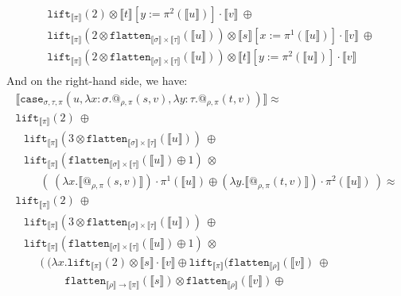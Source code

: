 \documentclass[a4paper,UKenglish,cleveref,autoref,numberwithinsect]{lipics-v2019}
\theoremstyle{definition}
\newcommand{\arrtype}{\rightarrow}
\newcommand{\abs}[2]{\lambda #1.#2}
\newcommand{\flatten}{\mathtt{flatten}}
\newcommand{\lift}{\mathtt{lift}}
\newcommand{\typeinterpret}[1]{\llbracket #1 \rrbracket}
\newcommand{\interpret}[1]{\llbracket #1 \rrbracket}
\begin{document}
\begin{itemize}
\[\begin{array}{l}
  \phantom{A}
  \lift_{\typeinterpret{\pi}}(2) \otimes
     \interpret{t}[y:=\pi^2(\interpret{u})] \cdot \interpret{v}\ 
     \oplus \\
  \phantom{A}
  \lift_{\typeinterpret{\pi}}(2 \otimes
    \flatten_{\typeinterpret{\sigma} \times \typeinterpret{\tau}}(
    \interpret{u})) \otimes
    \interpret{s}[x:=\pi^1(\interpret{u})] \cdot \interpret{v}\ \oplus \\
  \phantom{A}
  \lift_{\typeinterpret{\pi}}(2 \otimes
    \flatten_{\typeinterpret{\sigma} \times \typeinterpret{\tau}}(
    \interpret{u})) \otimes
     \interpret{t}[y:=\pi^2(\interpret{u})] \cdot \interpret{v} \\
  \end{array}
  \]
  And on the right-hand side, we have:
  \[
  \begin{array}{l}
  \interpret{\mathtt{case}_{\sigma,\tau,\pi}(u,\abs{x:\sigma}{
  @_{\rho,\pi}(s,v)},\abs{y:\tau}{@_{\rho,\pi}(t,v)})} \approx \\
  \lift_{\typeinterpret{\pi}}(2)\ \oplus \\
  \phantom{A}
  \lift_{\typeinterpret{\pi}}(3 \otimes \flatten_{\typeinterpret{\sigma}
    \times \typeinterpret{\tau}}(\interpret{u}))\ \oplus \\
  \phantom{A}
  \lift_{\typeinterpret{\pi}}(\flatten_{\typeinterpret{\sigma} \times
    \typeinterpret{\tau}}(\interpret{u}) \oplus 1)\ \otimes \\
  \phantom{ABC}
  (\ (\abs{x}{\interpret{@_{\rho,\pi}(s,v)}}) \cdot \pi^1(
      \interpret{u}) \oplus
     (\abs{y}{\interpret{@_{\rho,\pi}(t,v)}}) \cdot \pi^2(
      \interpret{u})\ ) \approx \\
  \lift_{\typeinterpret{\pi}}(2)\ \oplus \\
  \phantom{A}
  \lift_{\typeinterpret{\pi}}(3 \otimes \flatten_{\typeinterpret{\sigma}
    \times \typeinterpret{\tau}}(\interpret{u}))\ \oplus \\
  \phantom{A}
  \lift_{\typeinterpret{\pi}}(\flatten_{\typeinterpret{\sigma} \times
    \typeinterpret{\tau}}(\interpret{u}) \oplus 1)\ \otimes \\
  \phantom{ABC}
  (\ (\abs{x}{\lift_{\typeinterpret{\pi}}(2) \otimes
    \interpret{s} \cdot \interpret{v} \oplus
    \lift_{\typeinterpret{\pi}}(\flatten_{
    \typeinterpret{\rho}}(\interpret{v})\ \oplus \\
  \phantom{ABCDEF}\flatten_{\typeinterpret{\rho} \arrtype
    \typeinterpret{\pi}}(\interpret{s}) \otimes
    \flatten_{\typeinterpret{\rho}}(\interpret{v}) \oplus
}
\end{array}\]
\end{itemize}
\end{document}
